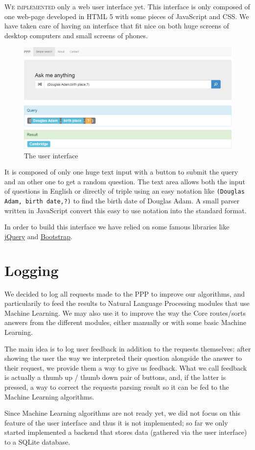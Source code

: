 \lettrine{W}{e implemented} only a web user interface yet. This interface
is only composed of one web-page developed in HTML 5 with some
pieces of JavaScript and CSS. We have taken care of having an
interface that fit nice on both huge screens of desktop computers
and small screens of phones.

\begin{figure}[!ht]
    \centering
    \includegraphics[scale=0.35]{WebUI.png}
    \caption{The user interface}
\end{figure}

It is composed of only one huge text input with a button to submit
the query and an other one to get a random question. The text area
allows both the input of questions in English or directly of triple using
an easy notation like \texttt{(Douglas Adam, birth date,?)} to find the
birth date of Douglas Adam. A small parser written in JavaScript convert
this easy to use notation into the standard format.

In order to build this interface we have relied on some famous libraries 
like \href{http://jquery.com/}{jQuery} and \href{http://getbootstrap.com/}{Bootstrap}.

\section{Logging}

We decided to log all requests made to the PPP to improve our algorithms,
and particularily to feed the results to Natural Language Processing
modules that use Machine Learning.
We may also use it to improve the way the Core routes/sorts answers
from the different modules, either manually or with some basic
Machine Learning.

The main idea is to log user feedback in addition to the requests
themselves: after showing the user the way we interpreted their
question alongside the answer to their request, we provide them a
way to give us feedback.
What we call feedback is actually a thumb up / thumb down pair of
buttons, and, if the latter is pressed, a way to correct the requests
parsing result so it can be fed to the Machine Learning algorithms.

Since Machine Learning algorithms are not ready yet, we did not focus
on this feature of the user interface and thus it is not implemented;
so far we only started implemented a backend that stores data
(gathered via the user interface) to a SQLite database.
